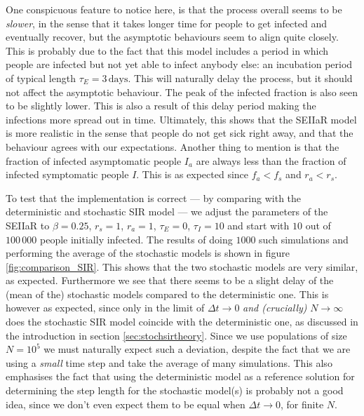 One conspicuous feature to notice here, is that the process overall seems to be \textit{slower}, in the sense that it takes longer time for people to get infected and eventually recover, but the asymptotic behaviours seem to align quite closely. This is probably due to the fact that this model includes a period in which people are infected but not yet able to infect anybody else: an incubation period of typical length $\tau_E = 3 \, \mathrm{days}$. This will naturally delay the process, but it should not affect the asymptotic behaviour. The peak of the infected fraction is also seen to be slightly lower. This is also a result of this delay period making the infections more spread out in time. Ultimately, this shows that the SEIIaR model is more realistic in the sense that people do not get sick right away, and that the behaviour agrees with our expectations. Another thing to mention is that the fraction of infected asymptomatic people $I_a$ are always less than the fraction of infected symptomatic people $I$. This is as expected since $f_a < f_s$ and $r_a < r_s$.

To test that the implementation is correct --- by comparing with the deterministic and stochastic SIR model --- we adjust the parameters of the SEIIaR to $\beta = 0.25$, $r_s = 1$, $r_a = 1$, $\tau_E = 0$, $\tau_I= 10$ and start with $10$ out of $100 \, 000$ people initially infected. The results of doing $1000$ such simulations and performing the average of the stochastic models is shown in figure \ref{fig:comparison_SIR}. This shows that the two stochastic models are very similar, as expected. Furthermore we see that there seems to be a slight delay of the (mean of the) stochastic models compared to the deterministic one. This is however as expected, since only in the limit of $\Delta t\to 0$ \textit{and (crucially)} $N\to \infty$ does the stochastic SIR model coincide with the deterministic one, as discussed in the introduction in section \ref{sec:stochsirtheory}. Since we use populations of size $N = 10^5$ we must naturally expect such a deviation, despite the fact that we are using a \textit{small} time step and take the average of many simulations. This also emphasises the fact that using the deterministic model as a reference solution for determining the step length for the stochastic model(s) is probably not a good idea, since we don't even expect them to be equal when $\Delta t \to 0$, for finite $N$. 


